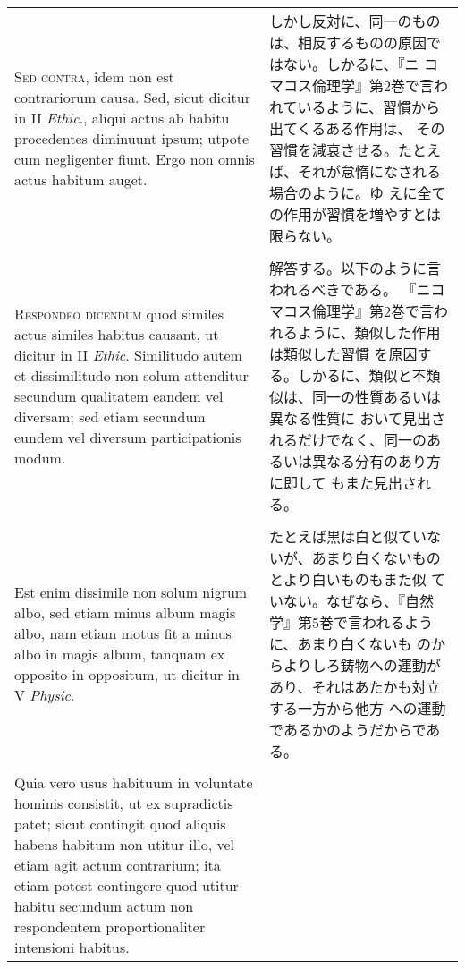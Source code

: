 \documentclass[10pt]{jsarticle} %
\begin{document}
\begin{longtable}{p{21em}p{21em}}
{\scshape Sed contra}, idem non est contrariorum causa. Sed, sicut dicitur in II
{\itshape Ethic}., aliqui actus ab habitu procedentes diminuunt ipsum; utpote cum
negligenter fiunt. Ergo non omnis actus habitum auget.

&

しかし反対に、同一のものは、相反するものの原因ではない。しかるに、『ニ
 コマコス倫理学』第2巻で言われているように、習慣から出てくるある作用は、
 その習慣を減衰させる。たとえば、それが怠惰になされる場合のように。ゆ
 えに全ての作用が習慣を増やすとは限らない。

\\\\



{\scshape Respondeo dicendum} quod similes actus similes habitus causant, ut
dicitur in II {\itshape Ethic}. Similitudo autem et dissimilitudo non solum
attenditur secundum qualitatem eandem vel diversam; sed etiam secundum
eundem vel diversum participationis modum. 


&

解答する。以下のように言われるべきである。
『ニコマコス倫理学』第2巻で言われるように、類似した作用は類似した習慣
 を原因する。しかるに、類似と不類似は、同一の性質あるいは異なる性質に
 おいて見出されるだけでなく、同一のあるいは異なる分有のあり方に即して
 もまた見出される。

\\\\


Est enim dissimile non
solum nigrum albo, sed etiam minus album magis albo, nam etiam motus
fit a minus albo in magis album, tanquam ex opposito in oppositum, ut
dicitur in V {\itshape Physic}. 



&

たとえば黒は白と似ていないが、あまり白くないものとより白いものもまた似
 ていない。なぜなら、『自然学』第5巻で言われるように、あまり白くないも
 のからよりしろ鋳物への運動があり、それはあたかも対立する一方から他方
 への運動であるかのようだからである。

\\\\

Quia vero usus habituum in voluntate hominis
consistit, ut ex supradictis patet; sicut contingit quod aliquis
habens habitum non utitur illo, vel etiam agit actum contrarium; ita
etiam potest contingere quod utitur habitu secundum actum non
respondentem proportionaliter intensioni habitus. 




\end{longtable}
\end{document}
